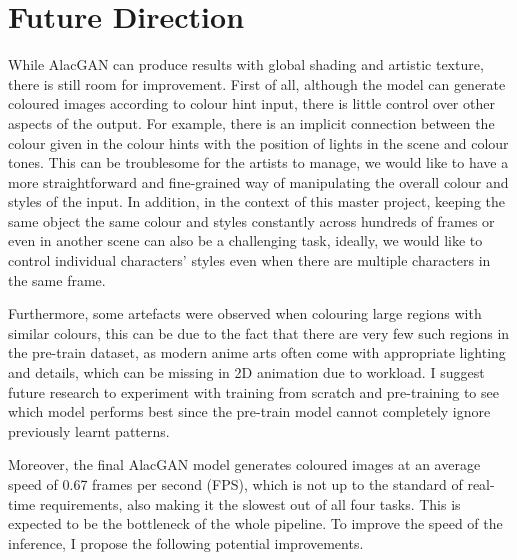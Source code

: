 \section{Future Direction}
While AlacGAN can produce results with global shading and artistic texture, there is still room for improvement. First of all, although the model can generate coloured images according to colour hint input, there is little control over other aspects of the output. For example, there is an implicit connection between the colour given in the colour hints with the position of lights in the scene and colour tones. This can be troublesome for the artists to manage, we would like to have a more straightforward and fine-grained way of manipulating the overall colour and styles of the input. In addition, in the context of this master project, keeping the same object the same colour and styles constantly across hundreds of frames or even in another scene can also be a challenging task, ideally, we would like to control individual characters' styles even when there are multiple characters in the same frame. 

Furthermore, some artefacts were observed when colouring large regions with similar colours, this can be due to the fact that there are very few such regions in the pre-train dataset, as modern anime arts often come with appropriate lighting and details, which can be missing in 2D animation due to workload. I suggest future research to experiment with training from scratch and pre-training to see which model performs best since the pre-train model cannot completely ignore previously learnt patterns.

Moreover, the final AlacGAN model generates coloured images at an average speed of 0.67 frames per second (FPS), which is not up to the standard of real-time requirements, also making it the slowest out of all four tasks. This is expected to be the bottleneck of the whole pipeline. To improve the speed of the inference, I propose the following potential improvements.

